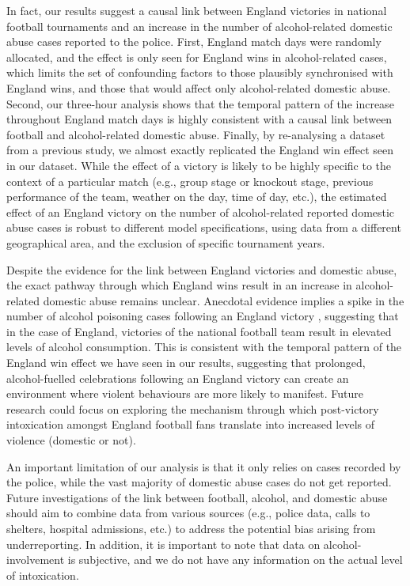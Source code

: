 \documentclass[12pt, a4paper]{article}
\begin{document}
In fact, our results suggest a causal link between England victories in national football tournaments and an increase in the number of alcohol-related domestic abuse cases reported to the police. First, England match days were randomly allocated, and the effect is only seen for England wins in alcohol-related cases, which limits the set of confounding factors to those plausibly synchronised with England wins, and those that would affect only alcohol-related domestic abuse. Second, our three-hour analysis shows that the temporal pattern of the increase throughout England match days is highly consistent with a causal link between football and alcohol-related domestic abuse. Finally, by re-analysing a dataset from a previous study, we almost exactly replicated the England win effect seen in our dataset. While the effect of a victory is likely to be highly specific to the context of a particular match (e.g., group stage or knockout stage, previous performance of the team, weather on the day, time of day, etc.), the estimated effect of an England victory on the number of alcohol-related reported domestic abuse cases is robust to different model specifications, using data from a different geographical area, and the exclusion of specific tournament years. 

Despite the evidence for the link between England victories and domestic abuse, the exact pathway through which England wins result in an increase in alcohol-related domestic abuse remains unclear. Anecdotal evidence implies a spike in the number of alcohol poisoning cases following an England victory  \cite{Davies2018}, suggesting that in the case of England, victories of the national football team result in elevated levels of alcohol consumption. This is consistent with the temporal pattern of the England win effect we have seen in our results, suggesting that prolonged, alcohol-fuelled celebrations following an England victory can create an environment where violent behaviours are more likely to manifest. Future research could focus on exploring the mechanism through which post-victory intoxication amongst England football fans translate into increased levels of violence (domestic or not).


An important limitation of our analysis is that it only relies on cases recorded by the police, while the vast majority of domestic abuse cases do not get reported. Future investigations of the link between football, alcohol, and domestic abuse should aim to combine data from various sources (e.g., police data, calls to shelters, hospital admissions, etc.) to address the potential bias arising from underreporting. In addition, it is important to note that data on alcohol-involvement is subjective, and we do not have any information on the actual level of intoxication. 
\end{document}
